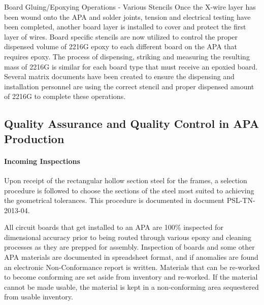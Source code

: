 
Board Gluing/Epoxying Operations - Various Stencils
Once the X-wire layer has been wound onto the APA and solder joints, tension and electrical testing have been completed, another board layer is installed to cover and protect the first layer of wires.  Board specific stencils are now utilized to control the proper dispensed volume of 2216G epoxy to each different board on the APA that requires epoxy. The process of dispensing, striking and measuring the resulting mass of 2216G is similar for each board type that must receive an epoxied board.  Several matrix documents have been created to ensure the dispensing and installation personnel are using the correct stencil and proper dispensed amount of 2216G to complete these operations.   




\subsection{Quality Assurance and Quality Control in APA Production}
\label{sec:fdsp-apa-qa}

\paragraph{Incoming Inspections}  Upon receipt of the rectangular hollow section steel for the frames, a selection procedure is followed to choose the sections of the steel most suited to achieving the geometrical tolerances. This procedure is documented in document PSL-TN-2013-04.  

All circuit boards that get installed to an APA are 100\% inspected for dimensional accuracy prior to being routed through various epoxy and cleaning processes as they are prepped for assembly. Inspection of boards and some other APA materials are documented in spreadsheet format, and if anomalies are found an electronic Non-Conformance report is written.  Materials that can be re-worked to become conforming are set aside from inventory and re-worked.  %
If the material cannot be made usable, the material is kept in a non-conforming area sequestered from usable inventory.   %

